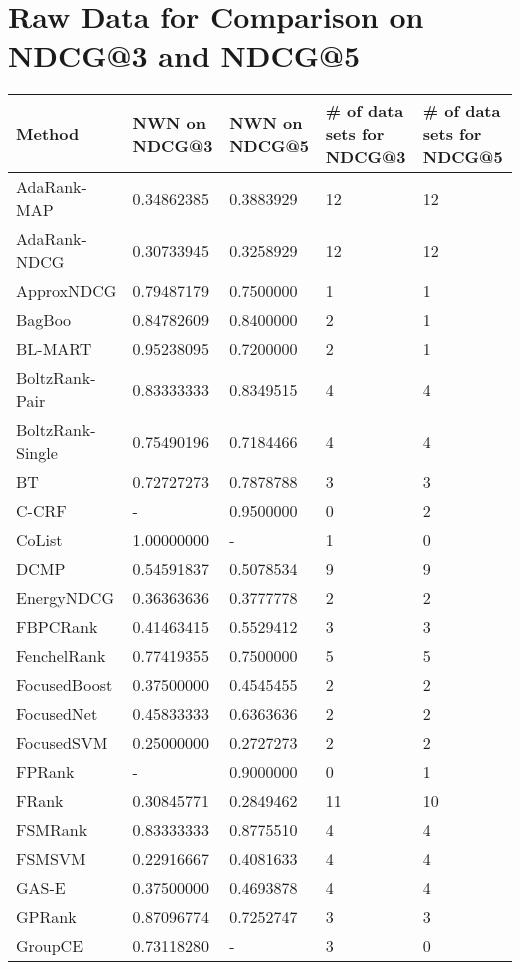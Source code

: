 \chapter{Raw Data for Comparison on NDCG@3 and NDCG@5}
\label{app:norm_winnum_ndcg35}

\begin{longtable}{l|p{2.3cm}|p{2.3cm}|p{2.3cm}|p{2.33cm}}
Method & \acs{NWN} on \acs{NDCG}@3 & \acs{NWN} on \acs{NDCG}@5 & \# of data sets for \acs{NDCG}@3 & \# of data sets for \acs{NDCG}@5\\
\hline
AdaRank-\acs{MAP} & 0.34862385 & 0.3883929 & 12 & 12\\ 
AdaRank-\acs{NDCG} & 0.30733945 & 0.3258929 & 12 & 12 \\ 
Approx\acs{NDCG} & 0.79487179 & 0.7500000 & 1 & 1 \\ 
BagBoo & 0.84782609 & 0.8400000 & 2 & 1\\ 
BL-MART & 0.95238095 & 0.7200000& 2 & 1\\ 
BoltzRank-Pair & 0.83333333 & 0.8349515 & 4 & 4\\ 
BoltzRank-Single & 0.75490196 & 0.7184466 & 4 & 4\\ 
BT & 0.72727273 & 0.7878788 & 3 & 3\\
C-\acs{CRF} & - & 0.9500000 & 0 & 2 \\  
CoList & 1.00000000 & - & 1 & 0 \\ 
DCMP & 0.54591837 & 0.5078534 & 9 & 9 \\ 
Energy\acs{NDCG} & 0.36363636 & 0.3777778 & 2 & 2\\ 
FBPCRank & 0.41463415 & 0.5529412 & 3 & 3 \\ 
FenchelRank & 0.77419355 & 0.7500000 & 5 & 5\\ 
FocusedBoost & 0.37500000 & 0.4545455 & 2 & 2 \\ 
FocusedNet & 0.45833333 & 0.6363636 & 2 & 2 \\ 
Focused\acs{SVM} & 0.25000000 & 0.2727273 & 2 & 2 \\
FPRank & - & 0.9000000 & 0 & 1 \\
FRank & 0.30845771 & 0.2849462 & 11 & 10 \\ 
FSMRank & 0.83333333 & 0.8775510 & 4 & 4\\ 
FSM\acs{SVM} & 0.22916667 & 0.4081633 & 4 & 4 \\ 
GAS-E & 0.37500000 & 0.4693878 & 4 & 4\\ 
\acs{GP}Rank & 0.87096774 & 0.7252747 & 3 & 3 \\ 
GroupCE & 0.73118280 & - & 3 & 0\\ 

\end{longtable}
